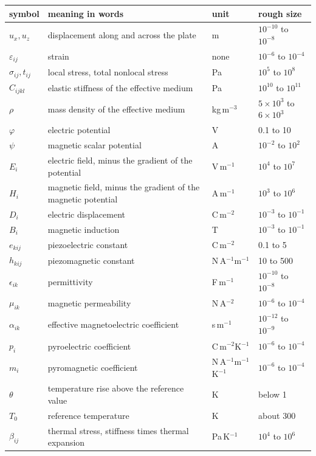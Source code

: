 \documentclass[11pt]{article}
\begin{document}
\begin{center}
\small
\begin{tabular}{p{1.9cm}p{6.0cm}p{2.4cm}p{2.6cm}}
\toprule
symbol & meaning in words & unit & rough size\\
\midrule
$u_x,u_z$ & displacement along and across the plate & m & $10^{-10}$ to $10^{-8}$\\
$\varepsilon_{ij}$ & strain & none & $10^{-6}$ to $10^{-4}$\\
$\sigma_{ij},t_{ij}$ & local stress, total nonlocal stress & Pa & $10^{5}$ to $10^{8}$\\
$C_{ijkl}$ & elastic stiffness of the effective medium & Pa & $10^{10}$ to $10^{11}$\\
$\rho$ & mass density of the effective medium & kg\,m$^{-3}$ & $5\times10^{3}$ to $6\times10^{3}$\\
$\varphi$ & electric potential & V & 0.1 to 10\\
$\psi$ & magnetic scalar potential & A & $10^{-2}$ to $10^{2}$\\
$E_i$ & electric field, minus the gradient of the potential & V\,m$^{-1}$ & $10^{4}$ to $10^{7}$\\
$H_i$ & magnetic field, minus the gradient of the magnetic potential & A\,m$^{-1}$ & $10^{3}$ to $10^{6}$\\
$D_i$ & electric displacement & C\,m$^{-2}$ & $10^{-3}$ to $10^{-1}$\\
$B_i$ & magnetic induction & T & $10^{-3}$ to $10^{-1}$\\
$e_{kij}$ & piezoelectric constant & C\,m$^{-2}$ & 0.1 to 5\\
$h_{kij}$ & piezomagnetic constant & N\,A$^{-1}$m$^{-1}$ & 10 to 500\\
$\epsilon_{ik}$ & permittivity & F\,m$^{-1}$ & $10^{-10}$ to $10^{-8}$\\
$\mu_{ik}$ & magnetic permeability & N\,A$^{-2}$ & $10^{-6}$ to $10^{-4}$\\
$\alpha_{ik}$ & effective magnetoelectric coefficient & s\,m$^{-1}$ & $10^{-12}$ to $10^{-9}$\\
$p_i$ & pyroelectric coefficient & C\,m$^{-2}$K$^{-1}$ & $10^{-6}$ to $10^{-4}$\\
$m_i$ & pyromagnetic coefficient & N\,A$^{-1}$m$^{-1}$K$^{-1}$ & $10^{-6}$ to $10^{-4}$\\
$\theta$ & temperature rise above the reference value & K & below 1\\
$T_0$ & reference temperature & K & about 300\\
$\beta_{ij}$ & thermal stress, stiffness times thermal expansion & Pa\,K$^{-1}$ & $10^{4}$ to $10^{6}$\\

\end{tabular}
\end{center}
\end{document}
